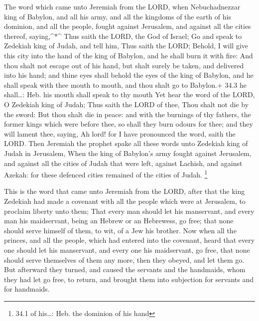  The word which came unto Jeremiah from the LORD, when
Nebuchadnezzar king of Babylon, and all his army, and all the kingdoms
of the earth of his dominion, and all the people, fought against
Jerusalem, and against all the cities thereof, saying,\^{}*\^{}
 Thus saith the LORD, the God of Israel; Go and speak to
Zedekiah king of Judah, and tell him, Thus saith the LORD; Behold, I
will give this city into the hand of the king of Babylon, and he shall
burn it with fire:  And thou shalt not escape out of his
hand, but shalt surely be taken, and delivered into his hand; and thine
eyes shall behold the eyes of the king of Babylon, and he shall speak
with thee mouth to mouth, and thou shalt go to Babylon.+ 34.3 he
shall\ldots: Heb. his mouth shall speak to thy mouth  Yet
hear the word of the LORD, O Zedekiah king of Judah; Thus saith the LORD
of thee, Thou shalt not die by the sword:  But thou shalt
die in peace: and with the burnings of thy fathers, the former kings
which were before thee, so shall they burn odours for thee; and they
will lament thee, saying, Ah lord! for I have pronounced the word, saith
the LORD.  Then Jeremiah the prophet spake all these words
unto Zedekiah king of Judah in Jerusalem,  When the king of
Babylon's army fought against Jerusalem, and against all the cities of
Judah that were left, against Lachish, and against Azekah: for these
defenced cities remained of the cities of Judah. \footnote{34.1 of
  his\ldots: Heb. the dominion of his hand}

 This is the word that came unto Jeremiah from the LORD,
after that the king Zedekiah had made a covenant with all the people
which were at Jerusalem, to proclaim liberty unto them; 
That every man should let his manservant, and every man his maidservant,
being an Hebrew or an Hebrewess, go free; that none should serve himself
of them, to wit, of a Jew his brother.  Now when all the
princes, and all the people, which had entered into the covenant, heard
that every one should let his manservant, and every one his maidservant,
go free, that none should serve themselves of them any more, then they
obeyed, and let them go.  But afterward they turned, and
caused the servants and the handmaids, whom they had let go free, to
return, and brought them into subjection for servants and for handmaids.

